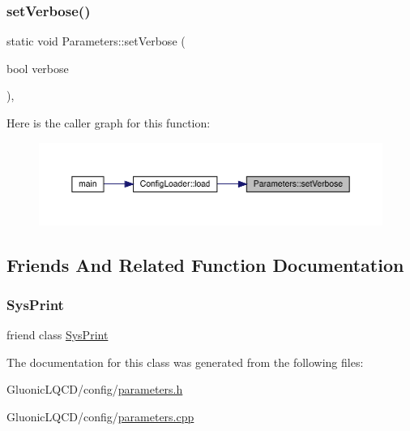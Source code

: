 \subsubsection{\texorpdfstring{setVerbose()}{setVerbose()}}
{\footnotesize\ttfamily static void Parameters\+::set\+Verbose (\begin{DoxyParamCaption}\item[{bool}]{verbose }\end{DoxyParamCaption})\hspace{0.3cm}{\ttfamily [inline]}, {\ttfamily [static]}}

Here is the caller graph for this function\+:\nopagebreak
\begin{figure}[H]
\begin{center}
\leavevmode
\includegraphics[width=350pt]{class_parameters_aa0ac9d09db506844758e0a5d23dedeb4_icgraph}
\end{center}
\end{figure}


\subsection{Friends And Related Function Documentation}
\mbox{\label{class_parameters_aa0fdc1e103aea3a32f97ca2009dda3e6}} 
\subsubsection{\texorpdfstring{SysPrint}{SysPrint}}
{\footnotesize\ttfamily friend class \mbox{\hyperlink{class_sys_print}{Sys\+Print}}\hspace{0.3cm}{\ttfamily [friend]}}



The documentation for this class was generated from the following files\+:\begin{DoxyCompactItemize}
\item 
Gluonic\+L\+Q\+C\+D/config/\mbox{\hyperlink{parameters_8h}{parameters.\+h}}\item 
Gluonic\+L\+Q\+C\+D/config/\mbox{\hyperlink{parameters_8cpp}{parameters.\+cpp}}\end{DoxyCompactItemize}
